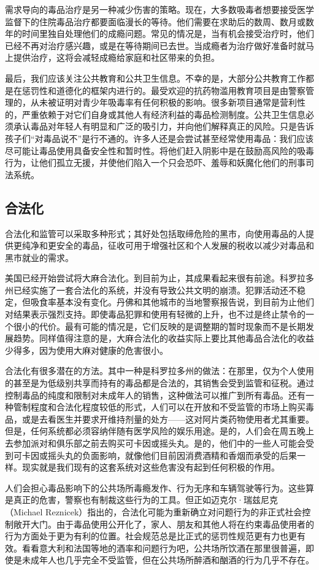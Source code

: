 \documentclass[fontset=fandol, a4paper, 12pt, openright]{ctexbook}
\begin{document}
需求导向的毒品治疗是另一种减少伤害的策略。现在，大多数吸毒者想要接受医学监督下的住院毒品治疗都要面临漫长的等待。他们需要在求助后的数周、数月或数年的时间里独自处理他们的成瘾问题。常见的情况是，当有机会接受治疗时，他们已经不再对治疗感兴趣，或是在等待期间已去世。当成瘾者为治疗做好准备时就马上提供治疗，这将会减轻成瘾给家庭和社区带来的负担。

最后，我们应该关注公共教育和公共卫生信息。不幸的是，大部分公共教育工作都是在惩罚性和道德化的框架内进行的。最受欢迎的抗药物滥用教育项目是由警察管理的，从未被证明对青少年吸毒率有任何积极的影响。很多新项目通常是营利性的，严重依赖于对它们自身或其他人有经济利益的毒品检测制度。公共卫生信息必须承认毒品对年轻人有明显和广泛的吸引力，并向他们解释真正的风险。只是告诉孩子们“对毒品说不”是行不通的。许多人还是会尝试甚至经常使用毒品：我们应该尽可能让毒品使用具备安全性和暂时性。将他们赶入阴影中是在鼓励高风险的吸毒行为，让他们孤立无援，并使他们陷入一个只会恐吓、羞辱和妖魔化他们的刑事司法系统。

\subsection{合法化}
合法化和监管可以采取多种形式；其好处包括取缔危险的黑市，向使用毒品的人提供更纯净和更安全的毒品，征收可用于增强社区和个人发展的税收以减少对毒品和黑市就业的需求。

美国已经开始尝试将大麻合法化。到目前为止，其成果看起来很有前途。科罗拉多州已经实施了一套合法化的系统，并没有导致公共文明的崩溃。犯罪活动还不稳定，但吸食率基本没有变化。丹佛和其他城市的当地警察报告说，到目前为止他们对结果表示强烈支持。即使毒品犯罪和使用有轻微的上升，也不过是终止禁令的一个很小的代价。最有可能的情况是，它们反映的是调整期的暂时现象而不是长期发展趋势。同样值得注意的是，大麻合法化的收益实际上要比其他毒品合法化的收益少得多，因为使用大麻对健康的危害很小。

合法化有很多潜在的方法。其中一种是科罗拉多州的做法：在那里，仅为个人使用的甚至是为低级别共享而持有的毒品都是合法的，其销售会受到监管和征税。通过控制毒品的纯度和限制对未成年人的销售，这种做法可以推广到所有毒品。还有一种管制程度和合法化程度较低的形式，人们可以在开放和不受监管的市场上购买毒品，或是去看医生并要求开维持剂量的处方——这对阿片类药物使用者尤其重要。但是，任何系统都必须容纳伴随有医学风险的娱乐用途。是的，人们会在周五晚上去参加派对和俱乐部之前去购买可卡因或摇头丸。是的，他们中的一些人可能会受到可卡因或摇头丸的负面影响，就像他们目前因消费酒精和香烟而承受的后果一样。现实就是我们现有的这套系统对这些危害没有起到任何积极的作用。

人们会担心毒品影响下的公共场所毒瘾发作、行为无序和车辆驾驶等行为。这些算是真正的危害，警察也有制裁这些行为的工具。但正如迈克尔·瑞兹尼克（Michael Reznicek）指出的，合法化可能为重新确立对问题行为的非正式社会控制敞开大门。由于毒品使用公开化了，家人、朋友和其他人将在约束毒品使用者的行为方面处于更为有利的位置。社会规范总是比正式的惩罚性规范更有力也更有效。看看意大利和法国等地的酒率和问题行为吧，公共场所饮酒在那里很普遍，即使是未成年人也几乎完全不受监管，但在公共场所醉酒和酗酒的行为几乎不存在。
\end{document}
